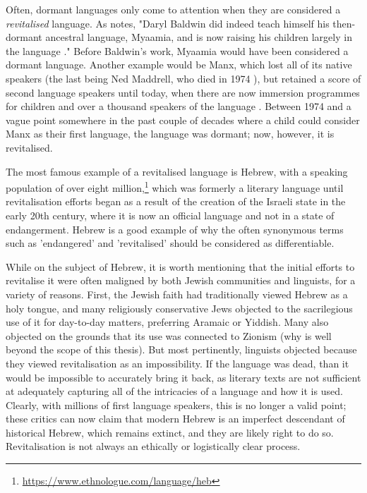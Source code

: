 Often, dormant languages only come to attention when they are considered a \textit{revitalised} language. As \citet{warner2007ethics} notes, "Daryl Baldwin did indeed teach himself his then-dormant ancestral language, Myaamia, and is now raising his children largely in the language \citep{hinton2001sleeping, leonard2004acquisition}." Before Baldwin's work, Myaamia would have been considered a dormant language. Another example would be Manx, which lost all of its native speakers (the last being Ned Maddrell, who died in 1974 \citep{wilson2008revitalization}), but retained a score of second language speakers until today, when there are now immersion programmes for children and over a thousand speakers of the language \citep{clague2009manx}. Between 1974 and a vague point somewhere in the past couple of decades where a child could consider Manx as their first language, the language was dormant; now, however, it is revitalised.

The most famous example of a revitalised language is Hebrew, with a speaking population of over eight million,\footnote{\href{https://www.ethnologue.com/language/heb}{https://www.ethnologue.com/language/heb}} which was formerly a literary language until revitalisation efforts began as a result of the creation of the Israeli state in the early 20th century, where it is now an official language and not in a state of endangerment. Hebrew is a good example of why the often synonymous terms such as 'endangered' and 'revitalised' should be considered as differentiable.

While on the subject of Hebrew, it is worth mentioning that the initial efforts to revitalise it were often maligned by both Jewish communities and linguists, for a variety of reasons. First, the Jewish faith had traditionally viewed Hebrew as a holy tongue, and many religiously conservative Jews objected to the sacrilegious use of it for day-to-day matters, preferring Aramaic or Yiddish. Many also objected on the grounds that its use was connected to Zionism (why is well beyond the scope of this thesis). But most pertinently, linguists objected because they viewed revitalisation as an impossibility. If the language was dead, than it would be impossible to accurately bring it back, as literary texts are not sufficient at adequately capturing all of the intricacies of a language and how it is used. Clearly, with millions of first language speakers, this is no longer a valid point; these critics can now claim that modern Hebrew is an imperfect descendant of historical Hebrew, which remains extinct, and they are likely right to do so. Revitalisation is not always an ethically or logistically clear process.

